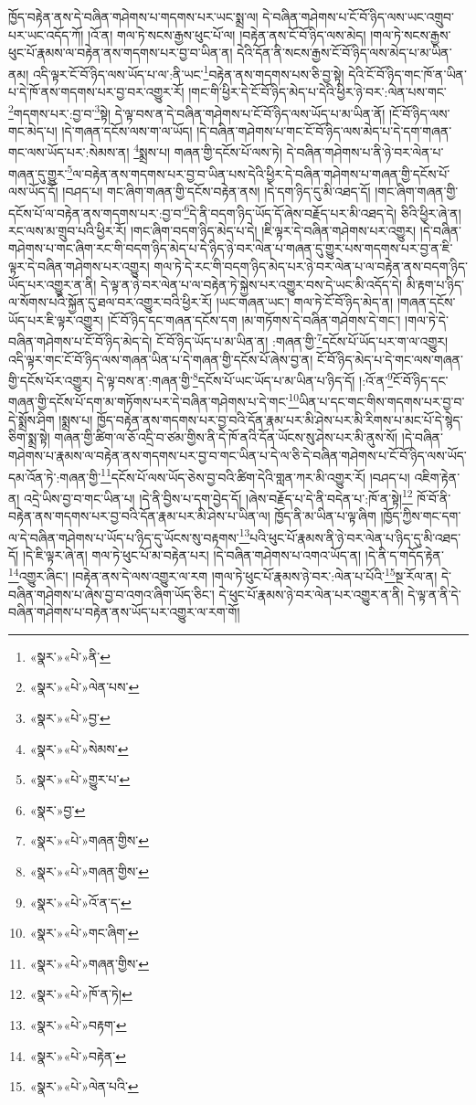 ཁྱོད་བརྟེན་ནས་དེ་བཞིན་གཤེགས་པ་གདགས་པར་ཡང་སྨྲ་ལ། དེ་བཞིན་གཤེགས་པ་ངོ་བོ་ཉིད་ལས་ཡང་འགྲུབ་པར་ཡང་འདོད་ཀོ། །འོ་ན། གལ་ཏེ་སངས་རྒྱས་ཕུང་པོ་ལ། །བརྟེན་ནས་ངོ་བོ་ཉིད་ལས་མེད། །གལ་ཏེ་སངས་རྒྱས་ཕུང་པོ་རྣམས་ལ་བརྟེན་ནས་གདགས་པར་བྱ་བ་ཡིན་ན། དེའི་དོན་ནི་སངས་རྒྱས་ངོ་བོ་ཉིད་ལས་མེད་པ་མ་ཡིན་ནམ། འདི་ལྟར་ངོ་བོ་ཉིད་ལས་ཡོད་པ་ལ་:ནི་ཡང་\footnote{«སྣར་»«པེ་»ནི་}བརྟེན་ནས་གདགས་པས་ཅི་བྱ་སྟེ། དེའི་ངོ་བོ་ཉིད་གང་ཁོ་ན་ཡིན་པ་དེ་ཁོ་ནས་གདགས་པར་བྱ་བར་འགྱུར་རོ། །གང་གི་ཕྱིར་དེ་ངོ་བོ་ཉིད་མེད་པ་དེའི་ཕྱིར་ཉེ་བར་:ལེན་པས་གང་\footnote{«སྣར་»«པེ་»ལེན་པས་}གདགས་པར་:བྱ་བ་\footnote{«སྣར་»«པེ་»བྱ་}སྟེ། དེ་ལྟ་བས་ན་དེ་བཞིན་གཤེགས་པ་ངོ་བོ་ཉིད་ལས་ཡོད་པ་མ་ཡིན་ནོ། །ངོ་བོ་ཉིད་ལས་གང་མེད་པ། །དེ་གཞན་དངོས་ལས་ག་ལ་ཡོད། །དེ་བཞིན་གཤེགས་པ་གང་ངོ་བོ་ཉིད་ལས་མེད་པ་དེ་དག་གཞན་གང་ལས་ཡོད་པར་:སེམས་ན། \footnote{«སྣར་»«པེ་»སེམས་}སྨྲས་པ། གཞན་གྱི་དངོས་པོ་ལས་ཏེ། དེ་བཞིན་གཤེགས་པ་ནི་ཉེ་བར་ལེན་པ་གཞན་དུ་གྱུར་\footnote{«སྣར་»«པེ་»གྱུར་པ་}ལ་བརྟེན་ནས་གདགས་པར་བྱ་བ་ཡིན་པས་དེའི་ཕྱིར་དེ་བཞིན་གཤེགས་པ་གཞན་གྱི་དངོས་པོ་ལས་ཡོད་དོ། །བཤད་པ། གང་ཞིག་གཞན་གྱི་དངོས་བརྟེན་ནས། །དེ་དག་ཉིད་དུ་མི་འཐད་དོ། །གང་ཞིག་གཞན་གྱི་དངོས་པོ་ལ་བརྟེན་ནས་གདགས་པར་:བྱ་བ་\footnote{«སྣར་»བྱ་}དེ་ནི་བདག་ཉིད་ཡོད་དོ་ཞེས་བརྗོད་པར་མི་འཐད་དེ། ཅིའི་ཕྱིར་ཞེ་ན། རང་ལས་མ་གྲུབ་པའི་ཕྱིར་རོ། །གང་ཞིག་བདག་ཉིད་མེད་པ་དེ། །ཇི་ལྟར་དེ་བཞིན་གཤེགས་པར་འགྱུར། །དེ་བཞིན་གཤེགས་པ་གང་ཞིག་རང་གི་བདག་ཉིད་མེད་པ་དེ་ཉིད་ཉེ་བར་ལེན་པ་གཞན་དུ་གྱུར་པས་གདགས་པར་བྱ་ན་ཇི་ལྟར་དེ་བཞིན་གཤེགས་པར་འགྱུར། གལ་ཏེ་དེ་རང་གི་བདག་ཉིད་མེད་པར་ཉེ་བར་ལེན་པ་ལ་བརྟེན་ནས་བདག་ཉིད་ཡོད་པར་འགྱུར་ན་ནི། དེ་ལྟ་ན་ཉེ་བར་ལེན་པ་ལ་བརྟེན་ཏེ་སྐྱེས་པར་འགྱུར་བས་དེ་ཡང་མི་འདོད་དེ། མི་རྟག་པ་ཉིད་ལ་སོགས་པའི་སྐྱོན་དུ་ཐལ་བར་འགྱུར་བའི་ཕྱིར་རོ། །ཡང་གཞན་ཡང་། གལ་ཏེ་ངོ་བོ་ཉིད་མེད་ན། །གཞན་དངོས་ཡོད་པར་ཇི་ལྟར་འགྱུར། །ངོ་བོ་ཉིད་དང་གཞན་དངོས་དག །མ་གཏོགས་དེ་བཞིན་གཤེགས་དེ་གང་། །གལ་ཏེ་དེ་བཞིན་གཤེགས་པ་ངོ་བོ་ཉིད་མེད་དེ། ངོ་བོ་ཉིད་ཡོད་པ་མ་ཡིན་ན། :གཞན་གྱི་\footnote{«སྣར་»«པེ་»གཞན་གྱིས་}དངོས་པོ་ཡོད་པར་ག་ལ་འགྱུར། འདི་ལྟར་གང་ངོ་བོ་ཉིད་ལས་གཞན་ཡིན་པ་དེ་གཞན་གྱི་དངོས་པོ་ཞེས་བྱ་ན། ངོ་བོ་ཉིད་མེད་པ་དེ་གང་ལས་གཞན་གྱི་དངོས་པོར་འགྱུར། དེ་ལྟ་བས་ན་:གཞན་གྱི་\footnote{«སྣར་»«པེ་»གཞན་གྱིས་}དངོས་པོ་ཡང་ཡོད་པ་མ་ཡིན་པ་ཉིད་དོ། །:འོ་ན་\footnote{«སྣར་»«པེ་»འོ་ན་ད་}ངོ་བོ་ཉིད་དང་གཞན་གྱི་དངོས་པོ་དག་མ་གཏོགས་པར་དེ་བཞིན་གཤེགས་པ་དེ་གང་\footnote{«སྣར་»«པེ་»གང་ཞིག་}ཡིན་པ་དང་གང་གིས་གདགས་པར་བྱ་བ་དེ་སྨྲོས་ཤིག །སྨྲས་པ། ཁྱོད་བརྟེན་ནས་གདགས་པར་བྱ་བའི་དོན་རྣམ་པར་མི་ཤེས་པར་མི་རིགས་པ་མང་པོ་དེ་སྙེད་ཅིག་སྨྲ་སྟེ། གཞན་གྱི་ཚིག་ལ་ཅོ་འདྲི་བ་ཙམ་གྱིས་ནི་དེ་ཁོ་ནའི་དོན་ཡོངས་སུ་ཤེས་པར་མི་ནུས་སོ། །དེ་བཞིན་གཤེགས་པ་རྣམས་ལ་བརྟེན་ནས་གདགས་པར་བྱ་བ་གང་ཡིན་པ་དེ་ལ་ཅི་དེ་བཞིན་གཤེགས་པ་ངོ་བོ་ཉིད་ལས་ཡོད་དམ་འོན་ཏེ་:གཞན་གྱི་\footnote{«སྣར་»«པེ་»གཞན་གྱིས་}དངོས་པོ་ལས་ཡོད་ཅེས་བྱ་བའི་ཚིག་དེའི་གླན་ཀར་མི་འགྱུར་རོ། །བཤད་པ། འཇིག་རྟེན་ན། འདྲེ་ཡིས་བྱ་བ་གང་ཡིན་པ། །དེ་ནི་བྱིས་པ་དག་བྱེད་དོ། །ཞེས་བརྗོད་པ་དེ་ནི་བདེན་པ་:ཁོ་ན་སྟེ།\footnote{«སྣར་»«པེ་»ཁོ་ན་ཏེ།} ཁོ་བོ་ནི་བརྟེན་ནས་གདགས་པར་བྱ་བའི་དོན་རྣམ་པར་མི་ཤེས་པ་ཡིན་ལ། ཁྱོད་ནི་མ་ཡིན་པ་ལྟ་ཞིག །ཁྱོད་ཀྱིས་གང་དག་ལ་དེ་བཞིན་གཤེགས་པ་ཡོད་པ་ཉིད་དུ་ཡོངས་སུ་བརྟགས་\footnote{«སྣར་»«པེ་»བརྟག་}པའི་ཕུང་པོ་རྣམས་ནི་ཉེ་བར་ལེན་པ་ཉིད་དུ་མི་འཐད་དོ། །དེ་ཇི་ལྟར་ཞེ་ན། གལ་ཏེ་ཕུང་པོ་མ་བརྟེན་པར། །དེ་བཞིན་གཤེགས་པ་འགའ་ཡོད་ན། །དེ་ནི་ད་གདོད་རྟེན་\footnote{«སྣར་»«པེ་»བརྟེན་}འགྱུར་ཞིང་། །བརྟེན་ནས་དེ་ལས་འགྱུར་ལ་རག །གལ་ཏེ་ཕུང་པོ་རྣམས་ཉེ་བར་:ལེན་པ་པོའི་\footnote{«སྣར་»«པེ་»ལེན་པའི་}སྔ་རོལ་ན། དེ་བཞིན་གཤེགས་པ་ཞེས་བྱ་བ་འགའ་ཞིག་ཡོད་ཅིང་། དེ་ཕུང་པོ་རྣམས་ཉེ་བར་ལེན་པར་འགྱུར་ན་ནི། དེ་ལྟ་ན་ནི་དེ་བཞིན་གཤེགས་པ་བརྟེན་ནས་ཡོད་པར་འགྱུར་ལ་རག་གོ། 